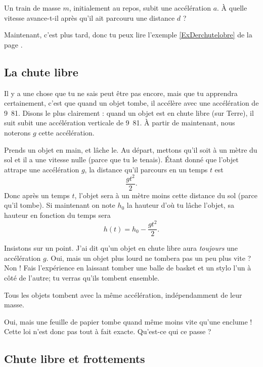 \begin{exercice}		\label{ExoTrainAccDistance}
	Un train de masse $m$, initialement au repos, subit une accélération $a$. À quelle vitesse avance-t-il après qu'il ait parcouru une distance $d$ ?
\end{exercice}

Maintenant, c'est plus tard, donc tu peux lire l'exemple \ref{ExDerchutelobre} de la page \pageref{ExDerchutelobre}.

\subsection{La chute libre}

Il y a une chose que tu ne sais peut être pas encore, mais que tu apprendra certainement, c'est que quand un objet tombe, il accélère avec une accélération de \unit{9.81}{\meter\per\square\second}. Disons le plus clairement : quand un objet est en chute libre (sur Terre), il suit subit une accélération verticale de \unit{9.81}{\meter\per\square\second}. À partir de maintenant, nous noterons $g$ cette accélération.

Prends un objet en main, et lâche le. Au départ, mettons qu'il soit à un mètre du sol et il a une vitesse nulle (parce que tu le tenais). Étant donné que l'objet attrape une accélération $g$, la distance qu'il parcours en un temps $t$ est 
\[ 
  \frac{ gt^2 }{ 2 }.
\]
Donc après un temps $t$, l'objet sera à un mètre moins cette distance du sol (parce qu'il tombe). Si maintenant on note $h_0$ la hauteur d'où tu lâche l'objet, sa hauteur en fonction du temps sera
\[ 
  h(t)=h_0-\frac{ gt^2 }{ 2 }.
\]

Insistons sur un point. J'ai dit qu'un objet en chute libre aura \emph{toujours} une accélération $g$. Oui, mais un objet plus lourd ne tombera pas un peu plus vite ? Non ! Fais l'expérience en laissant tomber une balle de basket et un stylo l'un à côté de l'autre; tu verras qu'ils tombent ensemble.
\begin{loiphyz}
Tous les objets tombent avec la même accélération, indépendamment de leur masse.
\end{loiphyz}
Oui, mais une feuille de papier tombe quand même moins vite qu'une enclume ! Cette loi n'est donc pas tout à fait exacte. Qu'est-ce qui ce passe ?

\subsection{Chute libre et frottements}

